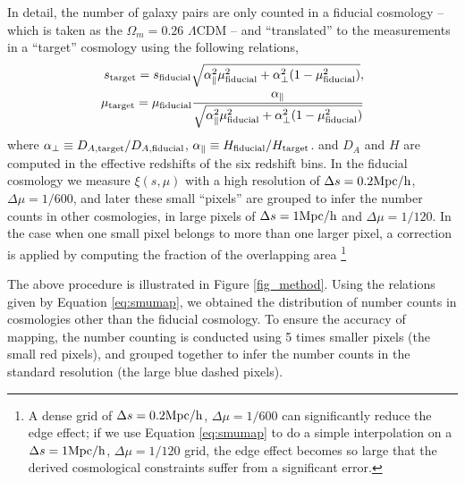 \documentclass[iop]{emulateapj}
\begin{document}
In detail, the number of galaxy pairs are only counted in a fiducial cosmology
-- which is taken as the $\Omega_m=0.26$ $\Lambda$CDM --
and ``translated'' to the measurements in a ``target'' cosmology using the following relations, 
\begin{eqnarray}\label{eq:smumap}
 s_{\rm target} = s_{\rm fiducial} \sqrt{\alpha_{\parallel}^2 \mu_{\rm fiducial}^2+\alpha_{\bot}^2(1-\mu_{\rm fiducial}^2)}, \\
 \mu_{\rm target} = \mu_{\rm fiducial} \frac{\alpha_\parallel}
 {\sqrt{\alpha_{\parallel}^2 \mu_{\rm fiducial}^2 +\alpha_{\bot}^2(1-\mu_{\rm fiducial}^2)}}
\end{eqnarray}
where $\alpha_{\bot}\equiv D_{A,\rm target}/D_{A,\rm fiducial}$,
$\alpha_{\parallel}\equiv H_{\rm fiducial}/H_{\rm target}$.
and $D_A$ and $H$ are computed in the effective redshifts of the six redshift bins.
In the fiducial cosmology
we measure $\xi(s,\mu)$ with a high resolution of
$\Delta s = 0.2 {\rm Mpc/h}$, $\Delta \mu = 1/600$,
and later these small ``pixels'' are grouped to infer 
the number counts in other cosmologies, 
in large pixels of $\Delta s = 1 {\rm Mpc/h}$ and $\Delta \mu = 1/120$.
In the case when one small pixel belongs to more than one larger pixel,
a correction is applied by computing the fraction of the overlapping area
\footnote{A dense grid of $\Delta s = 0.2 {\rm Mpc/h}$, $\Delta \mu = 1/600$ can significantly reduce the edge effect;
if we use Equation \ref{eq:smumap} to do a simple interpolation on a $\Delta s = 1 {\rm Mpc/h}$, $\Delta \mu = 1/120$  grid,
the edge effect becomes so large that the derived cosmological constraints suffer from a significant error.}

The above procedure is illustrated in Figure \ref{fig_method}.
Using the relations given by Equation \ref{eq:smumap},
we obtained the distribution of number counts in cosmologies other than the fiducial cosmology.
To ensure the accuracy of mapping, the number counting is conducted using 5 times smaller pixels (the small red pixels), 
and grouped together to infer the number counts in the standard resolution (the large blue dashed pixels).
\end{document}
